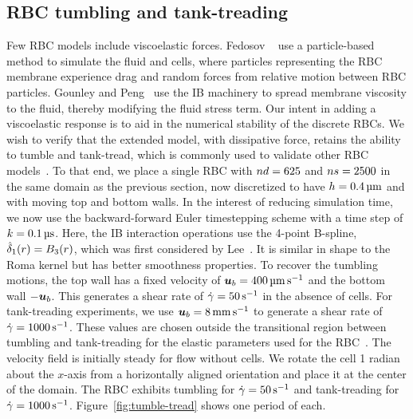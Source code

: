 \subsection{RBC tumbling and tank-treading}

Few RBC models include viscoelastic forces. Fedosov ~\cite{Fedosov:2010bc}
use a particle-based method to simulate the fluid and cells, where particles representing
the RBC membrane experience drag and random forces from relative motion between RBC
particles. Gounley and Peng~\cite{Gounley:2015ho} use the IB machinery to spread membrane
viscosity to the fluid, thereby modifying the fluid stress term. Our intent in adding a
viscoelastic response is to aid in the numerical stability of the discrete RBCs. We wish
to verify that the extended model, with dissipative force, retains the ability to tumble
and tank-tread, which is commonly used to validate other RBC models~\cite{Yazdani:2011cl,
Omori:2012hw, Fai:2013do, Xu:2013kk}. To that end, we place a single RBC with
$\data\cardinality=625$ and $\sample\cardinality = 2500$ in the same domain as the
previous section, now discretized to have $h = 0.4\um$ and with moving top and bottom
walls. In the interest of reducing simulation time, we now use the backward-forward Euler
timestepping scheme with a time step of $\timestep=0.1\us$. Here, the IB interaction
operations use the 4-point B-spline, $\hat{\delta}_1(r) = B_3(r)$, which was first considered by
Lee~\cite{Lee:2020tf}. It is similar in shape to the Roma kernel but has better
smoothness properties. To recover the tumbling motions, the top wall has a fixed velocity
of $\u_b=400\umpersec$ and the bottom wall $-\boldsymbol{u}_b$. This generates a shear rate of
$\shear=50\persec$ in the absence of cells. For tank-treading experiments, we use
$\u_b=8\mmpersec$ to generate a shear rate of $\shear=1000\persec$. These values are
chosen outside the transitional region between tumbling and tank-treading for the elastic
parameters used for the RBC~\cite{Kruger:2013ji}. The velocity field is initially steady
for flow without cells. We rotate the cell 1 radian about the $x$-axis from a
horizontally aligned orientation and place it at the center of the domain. The RBC
exhibits tumbling for $\shear=50\persec$ and tank-treading for $\shear=1000\persec$.
Figure~\ref{fig:tumble-tread} shows one period of each.

